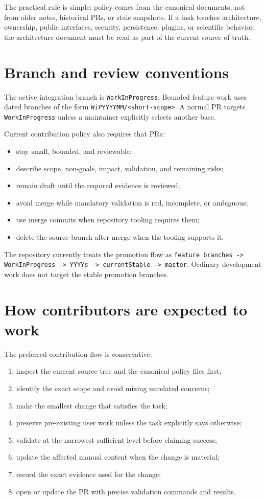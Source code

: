 The practical rule is simple: policy comes from the canonical documents, not
from older notes, historical PRs, or stale snapshots. If a task touches
architecture, ownership, public interfaces, security, persistence, plugins, or
scientific behavior, the architecture document must be read as part of the
current source of truth.

\section{Branch and review conventions}
\label{sec:governance-branch-review}

The active integration branch is \texttt{WorkInProgress}. Bounded feature work
uses dated branches of the form \texttt{WiPYYYYMM/<short-scope>}. A normal PR
targets \texttt{WorkInProgress} unless a maintainer explicitly selects another
base.

Current contribution policy also requires that PRs:
\begin{itemize}
\item stay small, bounded, and reviewable;
\item describe scope, non-goals, impact, validation, and remaining risks;
\item remain draft until the required evidence is reviewed;
\item avoid merge while mandatory validation is red, incomplete, or ambiguous;
\item use merge commits when repository tooling requires them;
\item delete the source branch after merge when the tooling supports it.
\end{itemize}

The repository currently treats the promotion flow as
\texttt{feature branches -> WorkInProgress -> YYYYs -> currentStable -> master}.
Ordinary development work does not target the stable promotion branches.

\section{How contributors are expected to work}
\label{sec:governance-contribution-flow}

The preferred contribution flow is conservative:
\begin{enumerate}
\item inspect the current source tree and the canonical policy files first;
\item identify the exact scope and avoid mixing unrelated concerns;
\item make the smallest change that satisfies the task;
\item preserve pre-existing user work unless the task explicitly says otherwise;
\item validate at the narrowest sufficient level before claiming success;
\item update the affected manual content when the change is material;
\item record the exact evidence used for the change;
\item open or update the PR with precise validation commands and results.
\end{enumerate}

